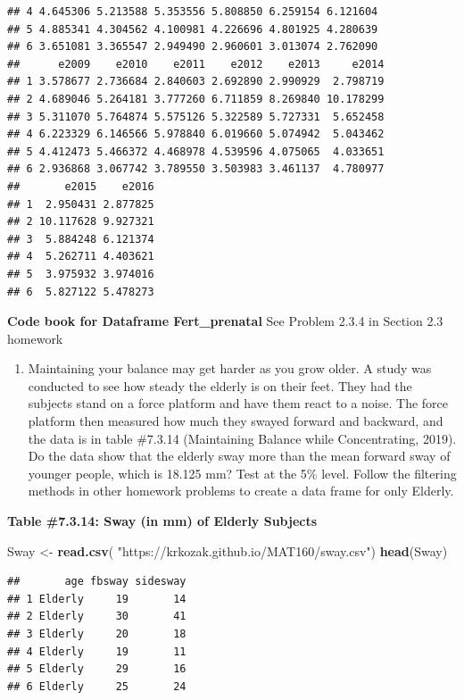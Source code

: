 \documentclass[
]{book}
\newenvironment{Shaded}{\begin{snugshade}}{\end{snugshade}}
\newcommand{\KeywordTok}[1]{\textcolor[rgb]{0.13,0.29,0.53}{\textbf{#1}}}
\newcommand{\NormalTok}[1]{#1}
\newcommand{\StringTok}[1]{\textcolor[rgb]{0.31,0.60,0.02}{#1}}
\providecommand{\tightlist}{%
  \setlength{\itemsep}{0pt}\setlength{\parskip}{0pt}}
\begin{document}
\begin{verbatim}
## 4 4.645306 5.213588 5.353556 5.808850 6.259154 6.121604
## 5 4.885341 4.304562 4.100981 4.226696 4.801925 4.280639
## 6 3.651081 3.365547 2.949490 2.960601 3.013074 2.762090
##      e2009    e2010    e2011    e2012    e2013     e2014
## 1 3.578677 2.736684 2.840603 2.692890 2.990929  2.798719
## 2 4.689046 5.264181 3.777260 6.711859 8.269840 10.178299
## 3 5.311070 5.764874 5.575126 5.322589 5.727331  5.652458
## 4 6.223329 6.146566 5.978840 6.019660 5.074942  5.043462
## 5 4.412473 5.466372 4.468978 4.539596 4.075065  4.033651
## 6 2.936868 3.067742 3.789550 3.503983 3.461137  4.780977
##       e2015    e2016
## 1  2.950431 2.877825
## 2 10.117628 9.927321
## 3  5.884248 6.121374
## 4  5.262711 4.403621
## 5  3.975932 3.974016
## 6  5.827122 5.478273
\end{verbatim}

\textbf{Code book for Dataframe Fert\_prenatal} See Problem 2.3.4 in Section 2.3 homework

\begin{enumerate}
\def\labelenumi{\arabic{enumi}.}
\setcounter{enumi}{6}
\tightlist
\item
  Maintaining your balance may get harder as you grow older. A study was conducted to see how steady the elderly is on their feet. They had the subjects stand on a force platform and have them react to a noise. The force platform then measured how much they swayed forward and backward, and the data is in table \#7.3.14 (Maintaining Balance while Concentrating, 2019). Do the data show that the elderly sway more than the mean forward sway of younger people, which is 18.125 mm? Test at the 5\% level. Follow the filtering methods in other homework problems to create a data frame for only Elderly.
\end{enumerate}

\textbf{Table \#7.3.14: Sway (in mm) of Elderly Subjects}

\begin{Shaded}
\begin{Highlighting}[]
\NormalTok{Sway <-}\StringTok{ }\KeywordTok{read.csv}\NormalTok{(}
  \StringTok{"https://krkozak.github.io/MAT160/sway.csv"}\NormalTok{)}
\KeywordTok{head}\NormalTok{(Sway)}
\end{Highlighting}
\end{Shaded}

\begin{verbatim}
##       age fbsway sidesway
## 1 Elderly     19       14
## 2 Elderly     30       41
## 3 Elderly     20       18
## 4 Elderly     19       11
## 5 Elderly     29       16
## 6 Elderly     25       24
\end{verbatim}
\end{document}
